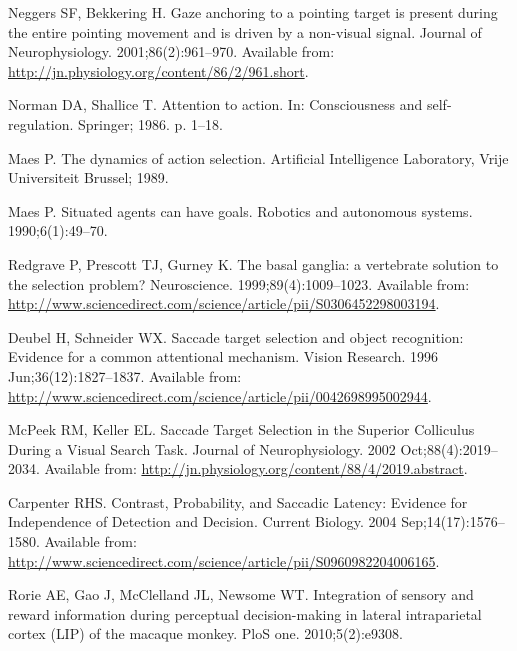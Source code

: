 \documentclass[10pt,letterpaper]{article}
\begin{document}
\begin{thebibliography}{10}
Neggers SF, Bekkering H.
\newblock Gaze anchoring to a pointing target is present during the entire
  pointing movement and is driven by a non-visual signal.
\newblock Journal of Neurophysiology. 2001;86(2):961--970.
\newblock Available from:
  \url{http://jn.physiology.org/content/86/2/961.short}.

Norman DA, Shallice T.
\newblock Attention to action.
\newblock In: Consciousness and self-regulation. Springer; 1986. p. 1--18.

Maes P.
\newblock The dynamics of action selection.
\newblock Artificial Intelligence Laboratory, Vrije Universiteit Brussel; 1989.

Maes P.
\newblock Situated agents can have goals.
\newblock Robotics and autonomous systems. 1990;6(1):49--70.

Redgrave P, Prescott TJ, Gurney K.
\newblock The basal ganglia: a vertebrate solution to the selection problem?
\newblock Neuroscience. 1999;89(4):1009--1023.
\newblock Available from:
  \url{http://www.sciencedirect.com/science/article/pii/S0306452298003194}.

Deubel H, Schneider WX.
\newblock Saccade target selection and object recognition: {Evidence} for a
  common attentional mechanism.
\newblock Vision Research. 1996 Jun;36(12):1827--1837.
\newblock Available from:
  \url{http://www.sciencedirect.com/science/article/pii/0042698995002944}.

McPeek RM, Keller EL.
\newblock Saccade {Target} {Selection} in the {Superior} {Colliculus} {During}
  a {Visual} {Search} {Task}.
\newblock Journal of Neurophysiology. 2002 Oct;88(4):2019--2034.
\newblock Available from:
  \url{http://jn.physiology.org/content/88/4/2019.abstract}.

Carpenter RHS.
\newblock Contrast, {Probability}, and {Saccadic} {Latency}: {Evidence} for
  {Independence} of {Detection} and {Decision}.
\newblock Current Biology. 2004 Sep;14(17):1576--1580.
\newblock Available from:
  \url{http://www.sciencedirect.com/science/article/pii/S0960982204006165}.

Rorie AE, Gao J, McClelland JL, Newsome WT.
\newblock Integration of sensory and reward information during perceptual
  decision-making in lateral intraparietal cortex ({LIP}) of the macaque
  monkey.
\newblock PloS one. 2010;5(2):e9308.


\end{thebibliography}
\end{document}
